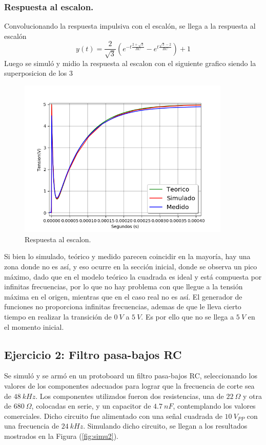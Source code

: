 \documentclass[a4paper]{article}
\begin{document}
\subsubsection{Respuesta al escalon.}
Convolucionando la respuesta impulsiva con el escalón, se llega a la respuesta al escalón
\begin{equation}
 y(t) = \frac{2}{\sqrt{3}} \left( e^{-t\frac{2 + \sqrt{3}}{RC}} - e^{t\frac{\sqrt{3} - 2}{RC}} \right) + 1
\label{equ:h*u}
\end{equation} 
Luego se simuló y midio la respuesta al escalon con el siguiente grafico siendo la superposicion de los 3
\begin{figure}[H]
	\centering
	\includegraphics[width=0.9\textwidth]{StepResponse.png}
\caption{Respuesta al escalon.}
	\label{fig:stepResponse}
\end{figure}
Si bien lo simulado, teórico y medido parecen coincidir en la mayoría, hay una zona donde no es así, y eso ocurre en la sección inicial, donde se observa un pico máximo, dado que en el modelo teórico la cuadrada es ideal y está compuesta por infinitas frecuencias, por lo que no hay problema con que llegue a la tensión máxima en el origen, mientras que en el caso real no es así. El generador de funciones no proporciona infinitas frecuencias, ademas de que le lleva cierto tiempo en realizar la transición de $0 \ V$ a $5 \ V$. Es por ello que no se llega a $5 \ V$ en el momento inicial.

\subsection{Ejercicio 2: Filtro pasa-bajos RC}
Se simuló y se armó en un protoboard un filtro pasa-bajos RC, seleccionando los valores de los componentes adecuados para lograr que la frecuencia de corte sea de $ 48 \ kHz $. Los componentes utilizados fueron dos resistencias, una de $22 \ \Omega$ y otra de $680 \ \Omega$, colocadas en serie, y un capacitor de $4.7 \ nF$, contemplando los valores comerciales.
Dicho circuito fue alimentado con una señal cuadrada de $ 10 \ V_{PP} $ con una frecuencia de $ 24 \ kHz $.
Simulando dicho circuito, se llegan a los resultados mostrados en la Figura (\ref{fig:simu2}).
\end{document}
